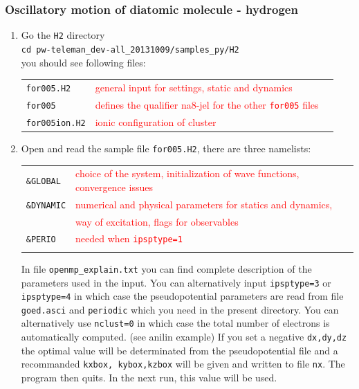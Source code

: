 \documentclass[10pt]{beamer}
\begin{document}
\begin{frame}
\frametitle{Oscillatory motion of diatomic molecule - hydrogen}
\begin{enumerate}
\item Go the {\tt H2} directory\\
\vspace*{0.2cm}
{\tt cd pw-teleman\_dev-all\_20131009/samples_py/H2}\\
\vspace*{0.2cm}
you should see following files:\\
\vspace*{0.2cm}
\begin{tabular}{lll}
{\tt for005.H2} &{\scriptsize{\textcolor{red}{general input for settings, static and dynamics}}}\\
{\tt for005}  &{\scriptsize{\textcolor{red}{defines the qualifier na8-jel for the other {\tt for005} files}}}\\
{\tt for005ion.H2} &{\scriptsize{\textcolor{red}{ionic configuration of cluster}}}\\
\end{tabular}
\vspace*{0.4cm}


\item Open and read the sample file {\tt for005.H2}, there are three namelists:\\
\vspace*{0.4cm}
\begin{tabular}{ll}
 {\tt \&GLOBAL} & {\scriptsize{\textcolor{red}{choice of the system, initialization of wave functions, convergence issues}}}\\
{\tt \&DYNAMIC}&{\scriptsize{\textcolor{red}{numerical and physical parameters for statics and dynamics, }}}\\
&{\scriptsize{\textcolor{red}{way of excitation, flags for observables}}}\\
 {\tt \&PERIO}&{\scriptsize{\textcolor{red}{needed when  {\tt ipsptype=1}}}}\\
 \vspace*{0.2cm}
\end{tabular}
In file {\tt openmp\_explain.txt} you can find complete description of the parameters used in the input. 
You can alternatively input  {\tt ipsptype=3} or  {\tt ipsptype=4} in which case the pseudopotential
parameters are read from file {\tt goed.asci} and {\tt periodic}  which you need in the present directory.
You can alternatively use  {\tt nclust=0} in which case the total number of electrons is automatically computed.
(see anilin example)
If you set a negative {\tt dx,dy,dz} the optimal value will be determinated from the pseudopotential file
and a recommanded {\tt kxbox, kybox,kzbox} will be given and written to file {\tt nx}. The program then quits. In the
next run, this value will be used.

\end{enumerate}
\end{frame}
\end{document}
